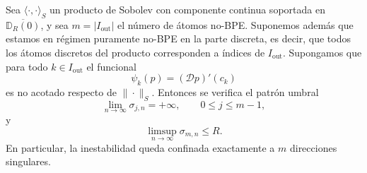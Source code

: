 \begin{theorem}\label{thm:umbral_singular_indice_m_enunciado}
	Sea $\langle\cdot,\cdot\rangle_S$ un producto de Sobolev con componente continua soportada en
	$\overline{\mathbb D_R(0)}$, y sea $m=|I_{\mathrm{out}}|$ el número de átomos no-BPE.
	Suponemos además que estamos en régimen puramente no-BPE en la parte discreta, es decir,
	que todos los átomos discretos del producto corresponden a índices de $I_{\mathrm{out}}$.
	Supongamos que para todo $k\in I_{\mathrm{out}}$ el funcional
	\[
		\psi_k(p)=(\mathcal Dp)'(c_k)
	\]
	es no acotado respecto de $\|\cdot\|_S$. Entonces se verifica el patrón umbral
	\[
		\lim_{n\to\infty}\sigma_{j,n}=+\infty,
		\qquad 0\le j\le m-1,
	\]
	y
	\[
		\limsup_{n\to\infty}\sigma_{m,n}\le R.
	\]
	En particular, la inestabilidad queda confinada exactamente a $m$ direcciones singulares.
\end{theorem}


